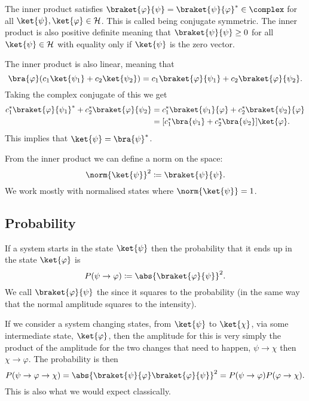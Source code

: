 \documentclass[fleqn]{NotesClass}
\newcommand*{\hilbert}{\mathcal{H}}
\begin{document}
    The inner product satisfies \(\braket{\varphi}{\psi} = \braket{\psi}{\varphi}^* \in \complex\) for all \(\ket{\psi}, \ket{\varphi} \in\hilbert\).
    This is called being conjugate symmetric.
    The inner product is also positive definite meaning that \(\braket{\psi}{\psi} \ge 0\) for all \(\ket{\psi}\in\hilbert\) with equality only if \(\ket{\psi}\) is the zero vector.
    
    The inner product is also linear, meaning that
    \begin{equation}
        \bra{\varphi}(c_1\ket{\psi_1} + c_2\ket{\psi_2}) = c_1\braket{\varphi}{\psi_1} + c_2\braket{\varphi}{\psi_2}.
    \end{equation}
    Taking the complex conjugate of this we get
    \begin{align}
        c_1^*\braket{\varphi}{\psi_1}^* + c_2^*\braket{\varphi}{\psi_2} &= c_1^*\braket{\psi_1}{\varphi} + c_2^*\braket{\psi_2}{\varphi}\\
        &= [c_1^*\bra{\psi_1} + c_2^*\bra{\psi_2}]\ket{\varphi}.
    \end{align}
    This implies that \(\ket{\psi} = \bra{\psi}^*\).
    
    From the inner product we can define a norm on the space:
    \begin{equation}
        \norm{\ket{\psi}}^2 \coloneqq \braket{\psi}{\psi}.
    \end{equation}
    We work mostly with normalised states where \(\norm{\ket{\psi}} = 1\).
    
    \subsection{Probability}
    If a system starts in the state \(\ket{\psi}\) then the probability that it ends up in the state \(\ket{\varphi}\) is
    \begin{equation}
        P(\psi \to \varphi) \coloneqq \abs{\braket{\varphi}{\psi}}^2.
    \end{equation}
    We call \(\braket{\varphi}{\psi}\) the  since it squares to the probability (in the same way that the normal amplitude squares to the intensity).
    
    If we consider a system changing states, from \(\ket{\psi}\) to \(\ket{\chi}\), via some intermediate state, \(\ket{\varphi}\), then the amplitude for this is very simply the product of the amplitude for the two changes that need to happen, \(\psi \to \chi\) then \(\chi\to\varphi\).
    The probability is then
    \begin{equation}
        P(\psi \to \varphi \to \chi) = \abs{\braket{\psi}{\varphi}\braket{\varphi}{\psi}}^2 = P(\psi\to\varphi)P(\varphi\to\chi).
    \end{equation}
    This is also what we would expect classically.
    
\end{document}
